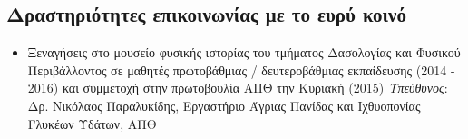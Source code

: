 \documentclass[12pt,]{scrartcl}
\begin{document}




\subsection{Δραστηριότητες επικοινωνίας με το ευρύ κοινό}\label{public_outreach}
\begin{itemize}
\vspace{-3mm}
\setlength\itemsep{-0.6em}
\item Ξεναγήσεις στο μουσείο φυσικής ιστορίας του τμήματος Δασολογίας και Φυσικού Περιβάλλοντος σε μαθητές πρωτοβάθμιας / δευτεροβάθμιας εκπαίδευσης (2014 - 2016) και συμμετοχή στην πρωτοβουλία \href{https://www.auth.gr/sites/default/files/web_final.pdf}{ΑΠΘ την Κυριακή} (2015)
\vspace{2mm}
\newline
\textit{Υπεύθυνος}: Δρ. Νικόλαος Παραλυκίδης, Εργαστήριο Άγριας Πανίδας και Ιχθυοπονίας Γλυκέων Υδάτων, ΑΠΘ
\end{itemize}




\end{document}
